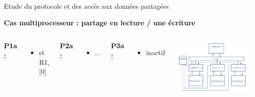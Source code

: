 \documentclass{beamer}
\begin{document}
\begin{frame}{Etude du protocole et des accès aux données partagées}
    \addtocounter{framenumber}{-1}
    \textbf{Cas multiprocesseur : partage en lecture / une écriture}
    \begin{columns}[c] %

        \textbf{P1a : }
        \begin{itemize}
            \item st R1, [0]
        \end{itemize}

        \textbf{P2a : }
        \begin{itemize}
            \item ...
        \end{itemize}

        \textbf{P3a : }
        \begin{itemize}
            \item inactif
        \end{itemize}

        \vspace{1cm}
        \includegraphics[scale=0.3]{archi.png}
        
    \end{columns}
\end{frame}
\end{document}
